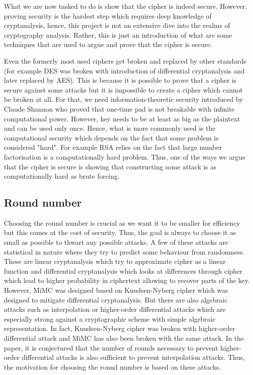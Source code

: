 \documentclass{Resources/UoBLab1}
\theoremstyle{definition}
\begin{document}
What we are now tasked to do is show that the cipher is indeed secure. However, proving security is the hardest step which requires deep knowledge of cryptanalysis, hence, this project is not an extensive dive into the realms of cryptography analysis. Rather, this is just an introduction of what are some techniques that are used to argue and prove that the cipher is secure.

Even the formerly most used ciphers get broken and replaced by other standards (for example DES was broken with introduction of differential cryptanalysis\cite{DESBreak} and later replaced by AES). This is because it is possible to prove that a cipher is secure against some attacks but it is impossible to create a cipher which cannot be broken at all. For that, we need information-theoretic security introduced by Claude Shannon who proved that one-time pad is not breakable with infinite computational power\cite{OneTime}. However, key needs to be at least as big as the plaintext and can be used only once. Hence, what is more commonly used is the computational security which depends on the fact that some problem is considered "hard". For example RSA relies on the fact that large number factorisation is a computationally hard problem. Thus, one of the ways we argue that the cipher is secure is showing that constructing some attack is as computationally hard as brute forcing.

\subsection{Round number}\label{sub:3.1}
Choosing the round number is crucial as we want it to be smaller for efficiency but this comes at the cost of security. Thus, the goal is always to choose it as small as possible to thwart any possible attacks. A few of these attacks are statistical in nature where they try to predict some behaviour from randomness. These are linear\cite{DESLinear} cryptanalysis which try to approximate cipher as a linear function and differential cryptanalysis\cite{DESBreak} which looks at differences through cipher which lead to higher probability in ciphertext allowing to recover parts of the key. However, MiMC was designed based on Knudsen-Nyberg cipher\cite{KNCipher} which was designed to mitigate differential cryptanalysis. But there are also algebraic attacks such as interpolation\cite{InterpolationAttack} or higher-order differential attacks\cite{HigherOrderAttack1}\cite{HigherOrderAttack2} which are especially strong against a cryptographic scheme with simple algebraic representation. In fact, Knudsen-Nyberg cipher was broken with higher-order differential attack\cite{InterpolationAttack} and MiMC has also been broken with the same attack\cite{MiMCAttack}. In the paper, it is conjectured that the number of rounds necessary to prevent higher-order differential attacks is also sufficient to prevent interpolation attacks. Thus, the motivation for choosing the round number is based on these attacks.\medskip
\end{document}
